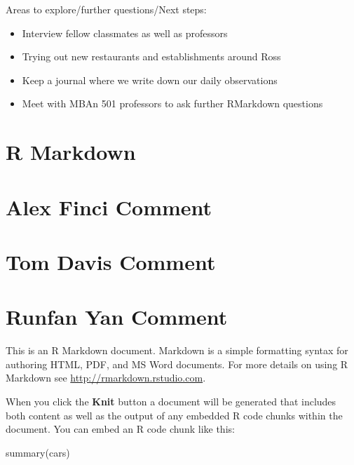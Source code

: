 \documentclass[
]{book}
\newenvironment{Shaded}{\begin{snugshade}}{\end{snugshade}}
\newcommand{\FunctionTok}[1]{\textcolor[rgb]{0.00,0.00,0.00}{#1}}
\newcommand{\NormalTok}[1]{#1}
\providecommand{\tightlist}{%
  \setlength{\itemsep}{0pt}\setlength{\parskip}{0pt}}
\begin{document}
Areas to explore/further questions/Next steps:

\begin{itemize}
\tightlist
\item
  Interview fellow classmates as well as professors
\item
  Trying out new restaurants and establishments around Ross
\item
  Keep a journal where we write down our daily observations
\item
  Meet with MBAn 501 professors to ask further RMarkdown questions
\end{itemize}

\hypertarget{r-markdown}{%
\section{R Markdown}\label{r-markdown}}

\hypertarget{alex-finci-comment}{%
\section{Alex Finci Comment}\label{alex-finci-comment}}

\hypertarget{tom-davis-comment}{%
\section{Tom Davis Comment}\label{tom-davis-comment}}

\hypertarget{runfan-yan-comment}{%
\section{Runfan Yan Comment}\label{runfan-yan-comment}}

This is an R Markdown document. Markdown is a simple formatting syntax for authoring HTML, PDF, and MS Word documents. For more details on using R Markdown see \url{http://rmarkdown.rstudio.com}.

When you click the \textbf{Knit} button a document will be generated that includes both content as well as the output of any embedded R code chunks within the document. You can embed an R code chunk like this:

\begin{Shaded}
\begin{Highlighting}[]
\FunctionTok{summary}\NormalTok{(cars)}
\end{Highlighting}
\end{Shaded}
\end{document}

